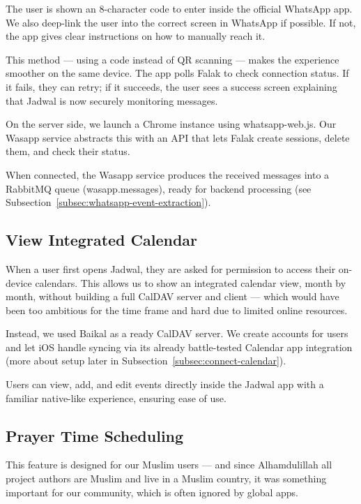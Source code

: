 The user is shown an 8-character code to enter inside the official WhatsApp app. We also deep-link the user into the correct screen in WhatsApp if possible. If not, the app gives clear instructions on how to manually reach it.

This method — using a code instead of QR scanning — makes the experience smoother on the same device. The app polls Falak to check connection status. If it fails, they can retry; if it succeeds, the user sees a success screen explaining that Jadwal is now securely monitoring messages.

On the server side, we launch a Chrome instance using whatsapp-web.js. Our Wasapp service abstracts this with an API that lets Falak create sessions, delete them, and check their status.

When connected, the Wasapp service produces the received messages into a RabbitMQ queue (wasapp.messages), ready for backend processing (see Subsection~\ref{subsec:whatsapp-event-extraction}).

\subsection{View Integrated Calendar}

When a user first opens Jadwal, they are asked for permission to access their on-device calendars. This allows us to show an integrated calendar view, month by month, without building a full CalDAV server and client — which would have been too ambitious for the time frame and hard due to limited online resources.

Instead, we used Baikal as a ready CalDAV server. We create accounts for users and let iOS handle syncing via its already battle-tested Calendar app integration (more about setup later in Subsection~\ref{subsec:connect-calendar}).

Users can view, add, and edit events directly inside the Jadwal app with a familiar native-like experience, ensuring ease of use.

\subsection{Prayer Time Scheduling} \label{subsec:schedule-prayer-times}

This feature is designed for our Muslim users — and since Alhamdulillah all project authors are Muslim and live in a Muslim country, it was something important for our community, which is often ignored by global apps.

